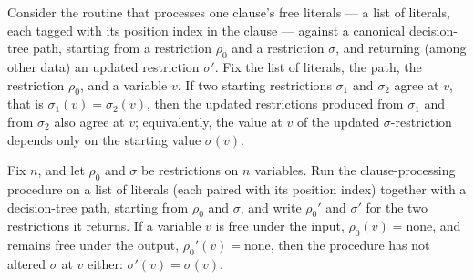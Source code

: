 \begin{lemma}
\label{SwitchingLemma.processClauseLits_sigma_at_v}
\leanok
{}
Consider the routine that processes one clause's free literals — a list of literals,
each tagged with its position index in the clause — against a canonical decision-tree
path, starting from a restriction $\rho_0$ and a restriction $\sigma$, and returning
(among other data) an updated restriction $\sigma'$. Fix the list of literals, the path,
the restriction $\rho_0$, and a variable $v$. If two starting restrictions $\sigma_1$
and $\sigma_2$ agree at $v$, that is $\sigma_1(v) = \sigma_2(v)$, then the updated
restrictions produced from $\sigma_1$ and from $\sigma_2$ also agree at $v$;
equivalently, the value at $v$ of the updated $\sigma$-restriction depends only on the
starting value $\sigma(v)$.
\end{lemma}

\begin{lemma}
\label{SwitchingLemma.processClauseLits_sigma_none_of_rho_none}
\leanok
{}
Fix $n$, and let $\rho_0$ and $\sigma$ be restrictions on $n$ variables. Run the
clause-processing procedure on a list of literals (each paired with its position index)
together with a decision-tree path, starting from $\rho_0$ and $\sigma$, and write
$\rho_0'$ and $\sigma'$ for the two restrictions it returns. If a variable $v$ is free
under the input, $\rho_0(v) = \mathrm{none}$, and remains free under the output,
$\rho_0'(v) = \mathrm{none}$, then the procedure has not altered $\sigma$ at $v$ either:
$\sigma'(v) = \sigma(v)$.
\end{lemma}

